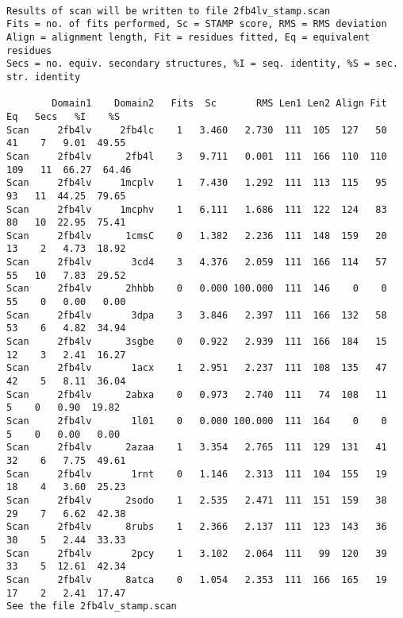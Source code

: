 \begin{scriptsize}\begin{verbatim}

Results of scan will be written to file 2fb4lv_stamp.scan
Fits = no. of fits performed, Sc = STAMP score, RMS = RMS deviation
Align = alignment length, Fit = residues fitted, Eq = equivalent residues
Secs = no. equiv. secondary structures, %I = seq. identity, %S = sec. str. identity

        Domain1    Domain2   Fits  Sc       RMS Len1 Len2 Align Fit  Eq   Secs   %I    %S 
Scan     2fb4lv     2fb4lc    1   3.460   2.730  111  105  127   50   41    7   9.01  49.55 
Scan     2fb4lv      2fb4l    3   9.711   0.001  111  166  110  110  109   11  66.27  64.46 
Scan     2fb4lv     1mcplv    1   7.430   1.292  111  113  115   95   93   11  44.25  79.65 
Scan     2fb4lv     1mcphv    1   6.111   1.686  111  122  124   83   80   10  22.95  75.41 
Scan     2fb4lv      1cmsC    0   1.382   2.236  111  148  159   20   13    2   4.73  18.92 
Scan     2fb4lv       3cd4    3   4.376   2.059  111  166  114   57   55   10   7.83  29.52 
Scan     2fb4lv      2hhbb    0   0.000 100.000  111  146    0    0   55    0   0.00   0.00 
Scan     2fb4lv       3dpa    3   3.846   2.397  111  166  132   58   53    6   4.82  34.94 
Scan     2fb4lv      3sgbe    0   0.922   2.939  111  166  184   15   12    3   2.41  16.27 
Scan     2fb4lv       1acx    1   2.951   2.237  111  108  135   47   42    5   8.11  36.04 
Scan     2fb4lv      2abxa    0   0.973   2.740  111   74  108   11    5    0   0.90  19.82 
Scan     2fb4lv       1l01    0   0.000 100.000  111  164    0    0    5    0   0.00   0.00 
Scan     2fb4lv      2azaa    1   3.354   2.765  111  129  131   41   32    6   7.75  49.61 
Scan     2fb4lv       1rnt    0   1.146   2.313  111  104  155   19   18    4   3.60  25.23 
Scan     2fb4lv      2sodo    1   2.535   2.471  111  151  159   38   29    7   6.62  42.38 
Scan     2fb4lv      8rubs    1   2.366   2.137  111  123  143   36   30    5   2.44  33.33 
Scan     2fb4lv       2pcy    1   3.102   2.064  111   99  120   39   33    5  12.61  42.34 
Scan     2fb4lv      8atca    0   1.054   2.353  111  166  165   19   17    2   2.41  17.47 
See the file 2fb4lv_stamp.scan
\end{verbatim} \end{scriptsize}

